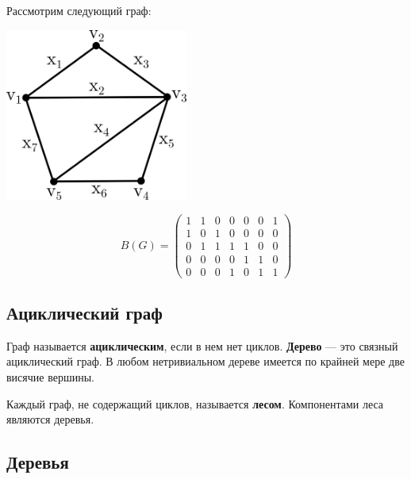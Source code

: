 \begin{example*}
    Рассмотрим следующий граф:

    \begin{multicols}{2}
        \begin{center}
            \includegraphics[width=0.45\textwidth]{images/incidence-matrix-example.png}
        \end{center}

        \columnbreak

        \null \vfill
        \[
            B(G) =
            \begin{pmatrix}
                1 & 1 & 0 & 0 & 0 & 0 & 1 \\
                1 & 0 & 1 & 0 & 0 & 0 & 0 \\
                0 & 1 & 1 & 1 & 1 & 0 & 0 \\
                0 & 0 & 0 & 0 & 1 & 1 & 0 \\
                0 & 0 & 0 & 1 & 0 & 1 & 1
            \end{pmatrix}
        \]
        \vfill \null
    \end{multicols}
\end{example*}

\subsection{Ациклический граф}

Граф называется \textbf{ациклическим}, если в нем нет циклов. \textbf{Дерево} --- это связный ациклический граф. В любом нетривиальном дереве имеется по крайней мере две висячие вершины.

Каждый граф, не содержащий циклов, называется \textbf{лесом}. Компонентами леса являются деревья.

\subsection{Деревья}

